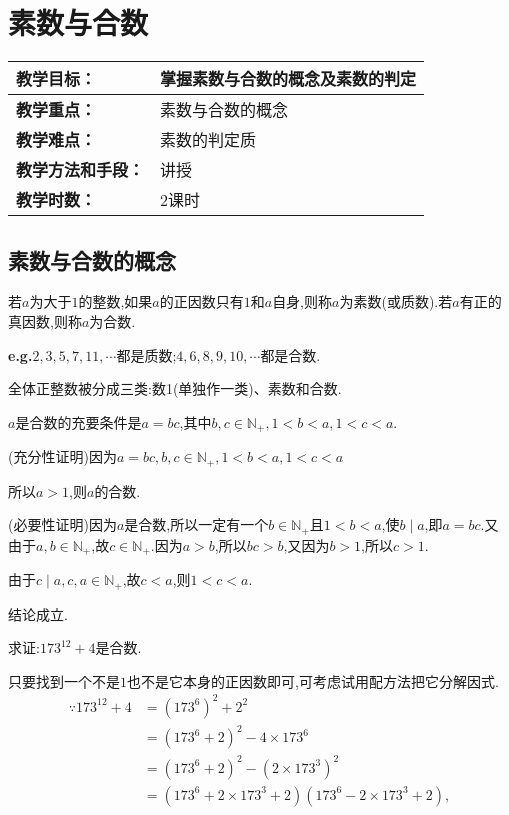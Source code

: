 \section{素数与合数}
\begin{table}[htb]
	\centering  
	\begin{tabular}{p{32mm}|p{95.6mm}}
		\hline 
		\textbf{教学目标：}       & 掌握素数与合数的概念及素数的判定  \\ \hline
		\textbf{教学重点：}       & 素数与合数的概念 \\ \hline
		\textbf{教学难点：}       & 素数的判定质\\ \hline
		\textbf{教学方法和手段：} & 讲授  \\ \hline
		\textbf{教学时数：}       & 2课时 \\ \hline
	\end{tabular}
\end{table}
\subsection{素数与合数的概念}
 若$a$为大于$1$的整数,如果$a$的正因数只有$1$和$a$自身,则称$a$为素数(或质数).若$a$有正的真因数,则称$a$为合数.

\entry \textbf{e.g.}$2,3,5,7,11,\cdots$都是质数;$4,6,8,9,10,\cdots$都是合数.

\remark 全体正整数被分成三类:数1(单独作一类)、素数和合数. 

\theorem $a$是合数的充要条件是$a=bc$,其中$b,c\in\mathbb{N}_{+},1<b<a,1<c<a$.

\proof (充分性证明)因为$a=bc,b,c\in\mathbb{N}_{+},1<b<a,1<c<a$

所以$a>1$,则$a$的合数.

(必要性证明)因为$a$是合数,所以一定有一个$b\in\mathbb{N}_{+}$且$1<b<a$,使$b\mid a$,即$a=bc$.又由于$a,b\in\mathbb{N}_{+}$,故$c\in\mathbb{N}_{+}$.因为$a>b$,所以$bc>b$,又因为$b>1$,所以$c>1$.

由于$c\mid a,c,a\in\mathbb{N}_{+}$,故$c<a$,则$1<c<a$.

结论成立.

\example 求证:$173^{12}+4$是合数.

\proof 只要找到一个不是$1$也不是它本身的正因数即可,可考虑试用配方法把它分解因式.
\begin{equation*}
	\begin{aligned}
		\because 173^{12}+4 &=\left(173^{6}\right)^{2}+2^{2} \\
		&=\left(173^{6}+2\right)^{2}-4 \times 173^{6} \\
		&=\left(173^{6}+2\right)^{2}-\left(2 \times 173^{3}\right)^{2} \\
		&=\left(173^{6}+2 \times 173^{3}+2\right)\left(173^{6}-2 \times 173^{3}+2\right),
	\end{aligned}
\end{equation*}

